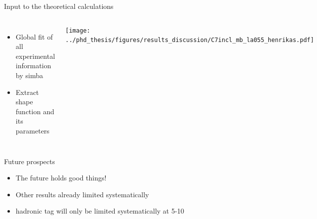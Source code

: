\documentclass[xcolor=dvipsnames]{beamer}
\begin{document}
\begin{frame}{Input to the theoretical calculations}
\begin{columns}
   \centering
   \begin{itemize}
      \item Global fit of all experimental information by simba
      \item Extract shape function and its parameters
   \end{itemize}
   \texttt{[image: ../phd\_thesis/figures/results\_discussion/C7incl\_mb\_la055\_henrikas.pdf]}

\end{columns}


\end{frame}   

\begin{frame}{Future prospects}
\scriptsize\centering
   \begin{itemize}
      \item The future holds good things!
      \item Other results already limited systematically
      \item[\ra] hadronic tag will only be limited systematically at 5-10~\invab
   \end{itemize}

\end{frame}

\appendix
\end{document}
